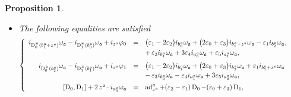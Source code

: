 \documentclass[final,1p,times,nopreprintline]{elsarticle}
\newtheorem{proposition}{Proposition}[section]
\theoremstyle{definition}
\numberwithin{equation}{section}
\newcommand{\rel}{\mathbb{R}}
\newcommand{\w}{\omega}
\newcommand{\et}{\quad \textnormal{and}\quad}
\newcommand{\id}{\operatorname{Id}}
\newcommand{\ai}{\mathfrak{a}}
\newcommand{\ad}{\operatorname{ad}}
\numberwithin{equation}{section}
\newcommand{\D}{\operatorname{D}}
\newcommand{\gl}{\mathfrak{gl}}
\begin{document}
\begin{proposition}
\begin{itemize}
\begin{equation*}
	\end{equation*}
with $a,b\in\ai$, satisfy the following:
	\begin{equation*}
		\delta_{_{a^\ai_0}}\varphi_0=\varphi_1\wedge (i_{a^\ai_1}\w_\ai),\et\delta_{_{a^\ai_0}}\varphi_1=-\varphi_0\wedge (i_{a^\ai_1}\w_\ai),
	\end{equation*}
	where $\delta_{_{a^\ai_0}}$ is the Chevalley-Eilenberg differential corresponding to the representation: 
	\begin{equation*}
		\rho_{_{a^\ai_0}}:\ai\longrightarrow\gl(\rel),\qquad a\longmapsto \w_\ai(a^\ai_0,a)\id_\rel\,;
	\end{equation*}
	\item[$5.$] The following equalities are satisfied
	\begin{equation}\label{PropSymLiAlgDoblExtDim2Prop0-C3}
		\left\{
		\begin{array}{r c l}\vspace{0.5mm}
			i_{\D_0^\divideontimes(b^\ai_1+z^\ai)}\w_\ai-i_{\D_1^\divideontimes(b^\ai_0)}\w_\ai+i_{z^\ai}\varphi_0&=&\big(\varepsilon_1-2\varepsilon_2\big)i_{b_0^\ai}\w_\ai+\big(2\varepsilon_0+\varepsilon_3\big)i_{b_1^\ai+z^\ai}\w_\ai-\varepsilon_1i_{b_2^\ai}\w_\ai,\\\vspace{2mm}
			&&+\,\varepsilon_3i_{b_1^\ai}\w_\ai+3\varepsilon_4 i_{a_0^\ai}\w_\ai+\varepsilon_5 i_{a_1^\ai}\w_\ai,\vspace{0.5mm}\\
i_{\D_0^\divideontimes(b_2^\ai)}\w_\ai-i_{\D_1^\divideontimes(b_1^\ai)}\w_\ai+i_{z^\ai}\varphi_1&=&\big(\varepsilon_1-2\varepsilon_2\big)i_{b_1^\ai}\w_\ai+\big(2\varepsilon_0+\varepsilon_3\big)i_{b_2^\ai}\w_\ai+\varepsilon_1i_{b_1^\ai+z^\ai}\w_\ai\\\vspace{2mm}
&&-\,\varepsilon_3i_{b^\ai_0}\w_\ai-\varepsilon_4i_{a^\ai_1}\w_\ai+3\varepsilon_5i_{a^\ai_0}\w_\ai,\\
\left[\D_0,\D_1\right]+2\,z^\ai\cdot i_{a^\ai_0}\w_\ai&=&\ad^\ai_{z^\ai}+(\varepsilon_2-\varepsilon_1)\D_0-(\varepsilon_0+\varepsilon_3)\D_1,
		\end{array}	\qquad\qquad
		\right.
	\end{equation}
	

\end{itemize}
\end{proposition}
\end{document}
